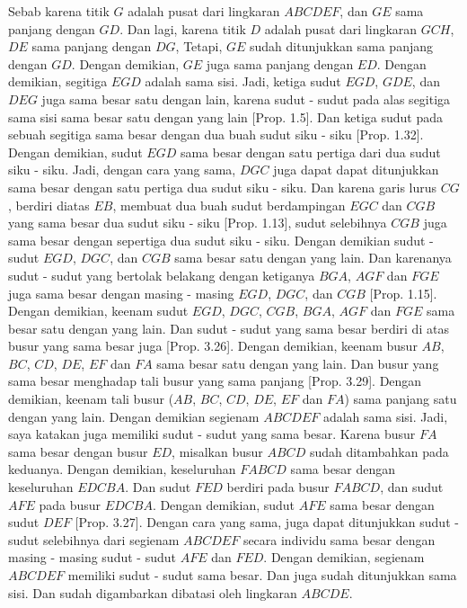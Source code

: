 \documentclass[a4paper]{book}
\begin{document}
Sebab karena titik $G$ adalah pusat dari lingkaran $ABCDEF$, dan $GE$ sama 
panjang dengan $GD$. Dan lagi, karena titik $D$ adalah pusat dari lingkaran
$GCH$, $DE$ sama panjang dengan $DG$, Tetapi, $GE$ sudah ditunjukkan sama
panjang dengan $GD$. Dengan demikian, $GE$ juga sama panjang dengan $ED$. 
Dengan demikian, segitiga $EGD$ adalah sama sisi. Jadi, ketiga sudut $EGD$,
$GDE$, dan $DEG$ juga sama besar satu dengan lain, karena sudut - sudut pada 
alas segitiga sama sisi sama besar satu dengan yang lain [Prop. 1.5]. Dan 
ketiga sudut pada sebuah segitiga sama besar dengan dua buah sudut siku - siku
[Prop. 1.32]. Dengan demikian, sudut $EGD$ sama besar dengan satu pertiga
dari dua sudut siku - siku. Jadi, dengan cara yang sama, $DGC$ juga dapat
dapat ditunjukkan sama besar dengan satu pertiga dua sudut siku - siku. Dan
karena garis lurus $CG$, berdiri diatas $EB$, membuat dua buah sudut 
berdampingan $EGC$ dan $CGB$ yang sama besar dua sudut siku - siku 
[Prop. 1.13], sudut selebihnya $CGB$ juga sama besar dengan sepertiga dua 
sudut siku - siku. Dengan demikian sudut - sudut $EGD$, $DGC$, dan $CGB$ sama
besar satu dengan yang lain. Dan karenanya sudut - sudut yang bertolak belakang
dengan ketiganya $BGA$, $AGF$ dan $FGE$ juga sama besar 
dengan masing - masing $EGD$, $DGC$, dan $CGB$ [Prop. 1.15]. Dengan demikian, 
keenam sudut $EGD$, $DGC$, $CGB$, $BGA$, $AGF$ dan $FGE$ sama besar satu
dengan yang  lain. Dan sudut - sudut yang sama besar berdiri di atas busur
yang sama besar juga [Prop. 3.26]. Dengan demikian, keenam busur $AB$, $BC$, 
$CD$, $DE$, $EF$ dan $FA$ sama besar satu dengan yang lain. Dan busur yang sama
besar menghadap tali busur yang sama panjang [Prop. 3.29]. Dengan demikian, 
keenam tali busur ($AB$, $BC$, $CD$, $DE$, $EF$ dan $FA$) sama panjang satu
dengan yang lain. Dengan demikian segienam $ABCDEF$ adalah sama sisi. Jadi, 
saya katakan juga memiliki sudut - sudut yang sama besar. Karena busur $FA$
sama besar dengan busur $ED$, misalkan busur $ABCD$ sudah ditambahkan pada 
keduanya. Dengan demikian, keseluruhan $FABCD$ sama besar dengan keseluruhan
$EDCBA$. Dan sudut $FED$ berdiri pada busur $FABCD$, dan sudut $AFE$ pada
busur $EDCBA$. Dengan demikian, sudut $AFE$ sama besar dengan sudut $DEF$
[Prop. 3.27]. Dengan cara yang sama, juga dapat ditunjukkan sudut - sudut
selebihnya dari segienam $ABCDEF$ secara individu sama besar dengan masing - 
masing sudut - sudut $AFE$ dan $FED$. Dengan demikian, segienam $ABCDEF$ 
memiliki sudut - sudut sama besar. Dan juga sudah ditunjukkan sama sisi.
Dan sudah digambarkan dibatasi oleh lingkaran $ABCDE$.
\end{document}
